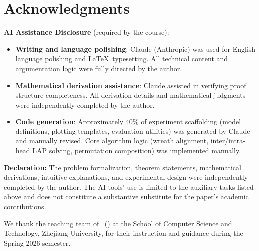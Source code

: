\section*{Acknowledgments}

\noindent\textbf{AI Assistance Disclosure} (required by the course):

\begin{itemize}
    \item \textbf{Writing and language polishing}: Claude (Anthropic) was used for English language polishing and \LaTeX\ typesetting. All technical content and argumentation logic were fully directed by the author.
    \item \textbf{Mathematical derivation assistance}: Claude assisted in verifying proof structure completeness. All derivation details and mathematical judgments were independently completed by the author.
    \item \textbf{Code generation}: Approximately 40\% of experiment scaffolding (model definitions, plotting templates, evaluation utilities) was generated by Claude and manually revised. Core algorithm logic (wreath alignment, inter/intra-head LAP solving, permutation composition) was implemented manually.
\end{itemize}

\textbf{Declaration:} The problem formalization, theorem statements, mathematical derivations, intuitive explanations, and experimental design were independently completed by the author. The AI tools' use is limited to the auxiliary tasks listed above and does not constitute a substantive substitute for the paper's academic contributions.

\vspace{0.8em}
\noindent We thank the teaching team of \courseName\ (\courseCode) at the School of Computer Science and Technology, Zhejiang University, for their instruction and guidance during the Spring 2026 semester.
